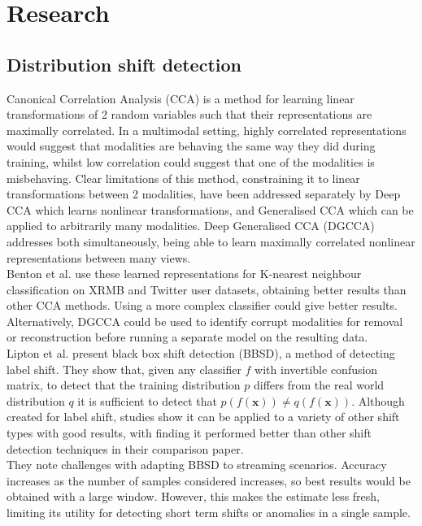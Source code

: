\chapter{Research}

\section{Distribution shift detection}
Canonical Correlation Analysis (CCA) \cite{CCA} is a method for learning linear transformations of 2 random variables such that their representations are maximally correlated. In a multimodal setting, highly correlated representations would suggest that modalities are behaving the same way they did during training, whilst low correlation could suggest that one of the modalities is misbehaving. Clear limitations of this method, constraining it to linear transformations between 2 modalities, have been addressed separately by Deep CCA \cite{DCCA} which learns nonlinear transformations, and Generalised CCA \cite{GCCA} which can be applied to arbitrarily many modalities. Deep Generalised CCA (DGCCA) \cite{DGCCA} addresses both simultaneously, being able to learn maximally correlated nonlinear representations between many views.\\

Benton et al. \cite{DGCCA} use these learned representations for K-nearest neighbour classification on XRMB and Twitter user datasets, obtaining better results than other CCA methods. Using a more complex classifier could give better results. Alternatively, DGCCA could be used to identify corrupt modalities for removal or reconstruction before running a separate model on the resulting data.\\

Lipton et al. \cite{BBSD} present black box shift detection (BBSD), a method of detecting label shift. They show that, given any classifier $f$ with invertible confusion matrix, to detect that the training distribution $p$ differs from the real world distribution $q$ it is sufficient to detect that $p(f(\boldsymbol{x}))\neq q(f(\boldsymbol{x}))$. Although created for label shift, studies show it can be applied to a variety of other shift types with good results, with \cite{failingloudly} finding it performed better than other shift detection techniques in their comparison paper.\\

They note challenges with adapting BBSD to streaming scenarios. Accuracy increases as the number of samples considered increases, so best results would be obtained with a large window. However, this makes the estimate less fresh, limiting its utility for detecting short term shifts or anomalies in a single sample.

